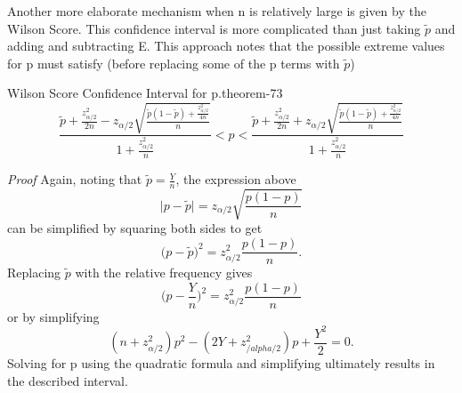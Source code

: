 \documentclass[10pt,]{book}
\makeatletter
\renewcommand*{\proofname}{Proof}
\renewenvironment{proof}[1][\proofname]{\par
  \pushQED{\qed}%
  \normalfont \topsep6\p@\@plus6\p@\relax
  \trivlist
  \item\relax
    {\itshape
    #1\@addpunct{.}}\hspace\labelsep\ignorespaces
}{%
  \popQED\endtrivlist\@endpefalse
}
\numberwithin{equation}{section}
\newcommand{\lt}{<}
\makeatother
\begin{document}
\par
\hypertarget{p-1351}{}%
Another more elaborate mechanism when n is relatively large is given by the Wilson Score. This confidence interval is more complicated than just taking \(\tilde{p}\) and adding and subtracting E. This approach notes that the possible extreme values for p must satisfy (before replacing some of the p terms with \(\tilde{p}\))%
\par
\hypertarget{p-1352}{}%
\begin{theorem}{Wilson Score Confidence Interval for p.}{}{theorem-73}%
\hypertarget{p-1353}{}%
%
\begin{equation*}
\frac{\tilde{p} + \frac{z_{\alpha/2}^2}{2n} - z_{\alpha/2} \sqrt{\frac{\tilde{p}(1-\tilde{p}) + \frac{z_{\alpha/2}^2}{4n}}{n}}}{1 + \frac{z_{\alpha/2}^2}{n}} \lt p \lt \frac{\tilde{p} + \frac{z_{\alpha/2}^2}{2n} + z_{\alpha/2} \sqrt{\frac{\tilde{p}(1-\tilde{p}) + \frac{z_{\alpha/2}^2}{4n}}{n}}}{1 + \frac{z_{\alpha/2}^2}{n}}
\end{equation*}
%
\end{theorem}
\begin{proof}\hypertarget{proof-73}{}
\hypertarget{p-1354}{}%
Again, noting that \(\tilde{p} = \frac{Y}{n}\), the expression above%
\begin{equation*}
\big | p - \tilde{p} \big | = z_{\alpha /2} \sqrt{\frac{p(1-p)}{n}}
\end{equation*}
can be simplified by squaring both sides to get%
\begin{equation*}
\big ( p - \tilde{p} \big )^2 = z_{\alpha /2}^2 \frac{p(1-p)}{n}.
\end{equation*}
Replacing \(\tilde{p}\) with the relative frequency gives%
\begin{equation*}
\big ( p - \frac{Y}{n} \big )^2 = z_{\alpha /2}^2 \frac{p(1-p)}{n}
\end{equation*}
or by simplifying%
\begin{equation*}
(n+z_{\alpha /2}^2 )p^2 - (2Y+z_{/alpha /2}^2) p + \frac{Y^2}{2} = 0.
\end{equation*}
Solving for p using the quadratic formula and simplifying ultimately results in the described interval.%
\end{proof}
%
\par
\hypertarget{p-1355}{}%
\end{document}
